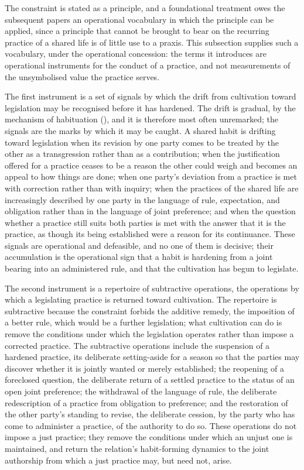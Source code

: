 The constraint is stated as a principle, and a foundational treatment owes the subsequent papers an operational vocabulary in which the principle can be applied, since a principle that cannot be brought to bear on the recurring practice of a shared life is of little use to a praxis. This subsection supplies such a vocabulary, under the operational concession: the terms it introduces are operational instruments for the conduct of a practice, and not measurements of the unsymbolised value the practice serves.

The first instrument is a set of signals by which the drift from cultivation toward legislation may be recognised before it has hardened. The drift is gradual, by the mechanism of habituation (), and it is therefore most often unremarked; the signals are the marks by which it may be caught. A shared habit is drifting toward legislation when its revision by one party comes to be treated by the other as a transgression rather than as a contribution; when the justification offered for a practice ceases to be a reason the other could weigh and becomes an appeal to how things are done; when one party's deviation from a practice is met with correction rather than with inquiry; when the practices of the shared life are increasingly described by one party in the language of rule, expectation, and obligation rather than in the language of joint preference; and when the question whether a practice still suits both parties is met with the answer that it is the practice, as though its being established were a reason for its continuance. These signals are operational and defeasible, and no one of them is decisive; their accumulation is the operational sign that a habit is hardening from a joint bearing into an administered rule, and that the cultivation has begun to legislate.

The second instrument is a repertoire of subtractive operations, the operations by which a legislating practice is returned toward cultivation. The repertoire is subtractive because the constraint forbids the additive remedy, the imposition of a better rule, which would be a further legislation; what cultivation can do is remove the conditions under which the legislation operates rather than impose a corrected practice. The subtractive operations include the suspension of a hardened practice, its deliberate setting-aside for a season so that the parties may discover whether it is jointly wanted or merely established; the reopening of a foreclosed question, the deliberate return of a settled practice to the status of an open joint preference; the withdrawal of the language of rule, the deliberate redescription of a practice from obligation to preference; and the restoration of the other party's standing to revise, the deliberate cession, by the party who has come to administer a practice, of the authority to do so. These operations do not impose a just practice; they remove the conditions under which an unjust one is maintained, and return the relation's habit-forming dynamics to the joint authorship from which a just practice may, but need not, arise.

